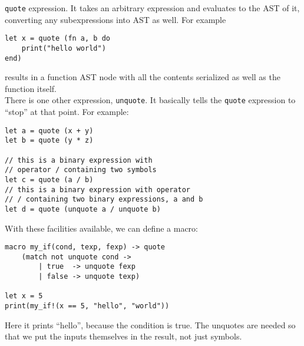 \documentclass{article}
\begin{document}
\verb|quote| expression. It takes an arbitrary expression and evaluates to
the AST of it, converting any subexpressions into AST as well. For example
\begin{lstlisting}[language=vortex]
let x = quote (fn a, b do
    print("hello world")
end)
\end{lstlisting}
results in a function AST node with all the contents serialized as well as
the function itself.\\
There is one other expression, \verb|unquote|. It basically tells the
\verb|quote| expression to \enquote{stop} at that point. For example:
\begin{lstlisting}[language=vortex]
let a = quote (x + y)
let b = quote (y * z)

// this is a binary expression with
// operator / containing two symbols
let c = quote (a / b)
// this is a binary expression with operator
// / containing two binary expressions, a and b
let d = quote (unquote a / unquote b)
\end{lstlisting}
With these facilities available, we can define a macro:
\begin{lstlisting}[language=vortex]
macro my_if(cond, texp, fexp) -> quote
    (match not unquote cond ->
        | true  -> unquote fexp
        | false -> unquote texp)

let x = 5
print(my_if!(x == 5, "hello", "world"))
\end{lstlisting}
Here it prints \enquote{hello}, because the condition is true. The unquotes
are needed so that we put the inputs themselves in the result, not just
symbols.
\end{document}
